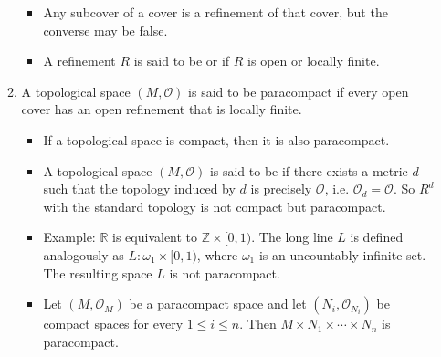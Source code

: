 \documentclass{article}
\begin{document}
\begin{enumerate}
\begin{enumerate}
        \begin{itemize}
            \item Any subcover of a cover is a refinement of that cover, but the converse may be false. 
            \item A refinement $R$ is said to be  or  if $R$ is open or  locally finite.
        \end{itemize}
        \item {} A topological space $(M, \mathcal{O})$ is said to be paracompact if every open cover has an open refinement that is locally finite.
        \begin{itemize}
            \item If a topological space is compact, then it is also paracompact.
            \item  A topological space $(M, \mathcal{O})$ is said to be  if there exists a metric $d$ such that the topology induced by $d$ is precisely $\mathcal{O}$, i.e. $\mathcal{O}_{d}=\mathcal{O}$.  So  $R^d$ with the  standard topology is not compact but paracompact.
            \item Example: $\mathbb{R}$ is equivalent to $\mathbb{Z} \times[0,1)$. The long line $L$ is defined analogously as $L: \omega_{1} \times[0,1)$, where $\omega_{1}$ is an uncountably infinite set. The resulting space $L$ is not paracompact.
            \item {} Let $\left(M, \mathcal{O}_{M}\right)$ be a paracompact space and let $\left(N_{i}, \mathcal{O}_{N_{i}}\right)$ be compact spaces for every $1 \leq i \leq n$. Then $M \times N_{1} \times \cdots \times N_{n}$ is paracompact.


\end{itemize}
\end{enumerate}
\end{enumerate}
\end{document}
